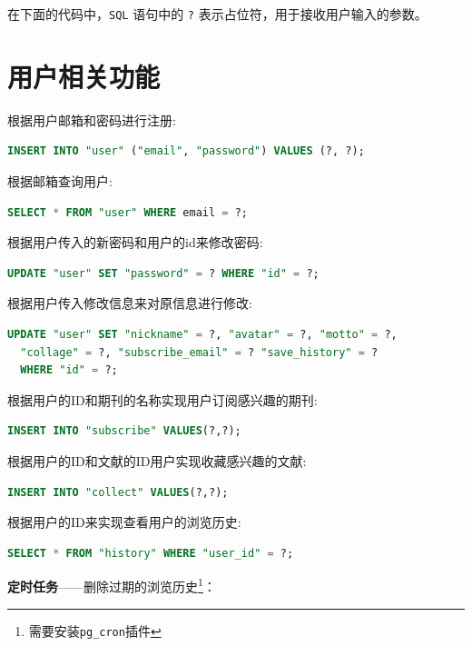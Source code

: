 \documentclass[UTF8,openany]{ctexbook}
\begin{document}
在下面的代码中，\texttt{SQL} 语句中的 \texttt{?} 表示占位符，用于接收用户输入的参数。

\section{用户相关功能}

根据用户邮箱和密码进行注册:

\begin{lstlisting}[language=SQL]
INSERT INTO "user" ("email", "password") VALUES (?, ?);
\end{lstlisting}

根据邮箱查询用户:

\begin{lstlisting}[language=SQL]
SELECT * FROM "user" WHERE email = ?;
\end{lstlisting}

根据用户传入的新密码和用户的id来修改密码:

\begin{lstlisting}[language=SQL]
UPDATE "user" SET "password" = ? WHERE "id" = ?;
\end{lstlisting}

根据用户传入修改信息来对原信息进行修改:

\begin{lstlisting}[language=SQL]
UPDATE "user" SET "nickname" = ?, "avatar" = ?, "motto" = ?, 
  "collage" = ?, "subscribe_email" = ? "save_history" = ? 
  WHERE "id" = ?;
\end{lstlisting}

根据用户的ID和期刊的名称实现用户订阅感兴趣的期刊:

\begin{lstlisting}[language=SQL]
INSERT INTO "subscribe" VALUES(?,?);
\end{lstlisting}

根据用户的ID和文献的ID用户实现收藏感兴趣的文献:

\begin{lstlisting}[language=SQL]
INSERT INTO "collect" VALUES(?,?); 
\end{lstlisting}

根据用户的ID来实现查看用户的浏览历史:

\begin{lstlisting}[language=SQL]
SELECT * FROM "history" WHERE "user_id" = ?;
\end{lstlisting}

\textbf{定时任务}——删除过期的浏览历史\footnote{需要安装\texttt{pg\_cron}插件}：
\end{document}
